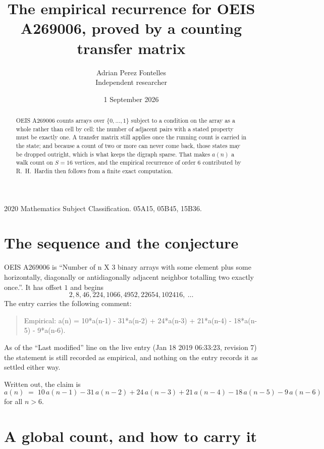 \documentclass[11pt,a4paper]{article}
\title{The empirical recurrence for OEIS A269006, proved by a counting transfer matrix}
\author{Adrian Perez Fontelles\\ \small Independent researcher}
\date{1 September 2026}
\theoremstyle{plain}
\theoremstyle{definition}
\begin{document}
\maketitle

\begin{abstract}
OEIS A269006 counts arrays over $\{0,\dots,1\}$ subject to a condition on the array as a
whole rather than cell by cell: the number of adjacent pairs with a stated property must be
exactly one. A transfer matrix still applies once the running count is carried in the state; and
because a count of two or more can never come back, those states may be dropped outright,
which is what keeps the digraph sparse. That makes $a(n)$ a walk count on $S=16$ vertices,
and the empirical recurrence of order $6$ contributed by R.~H.~Hardin then follows from
a finite exact computation.
\end{abstract}

\noindent\small 2020 Mathematics Subject Classification. 05A15, 05B45, 15B36.\normalsize

\section{The sequence and the conjecture}

OEIS A269006 is ``Number of n X 3 binary arrays with some element plus some horizontally, diagonally or antidiagonally adjacent neighbor totalling two exactly once.''. It has offset $1$ and begins
\[
2, 8, 46, 224, 1066, 4952, 22654, 102416,\ \dots
\]
The entry carries the following comment:
\begin{quote}\small
Empirical: a(n) = 10*a(n-1) - 31*a(n-2) + 24*a(n-3) + 21*a(n-4) - 18*a(n-5) - 9*a(n-6).
\end{quote}
As of the ``Last modified'' line on the live entry (Jan 18 2019 06:33:23, revision 7) the statement is
still recorded as empirical, and nothing on the entry records it as settled either way.

Written out, the claim is
\begin{equation}\label{eq:conj}
a(n)\;=\;10\,a(n-1) - 31\,a(n-2) + 24\,a(n-3) + 21\,a(n-4) - 18\,a(n-5) - 9\,a(n-6)
\end{equation}
for all $n>6$.

\section{A global count, and how to carry it}
\end{document}
